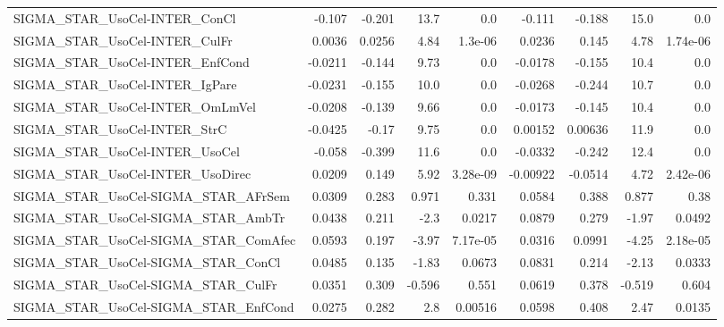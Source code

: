 \begin{tabular}{lrrrrrrrr}
SIGMA\_STAR\_UsoCel-INTER\_ConCl          &      -0.107 &       -0.201 &     13.7 &      0.0 &     -0.111 &      -0.188 &         15.0 &           0.0 \\
SIGMA\_STAR\_UsoCel-INTER\_CulFr          &      0.0036 &       0.0256 &     4.84 &  1.3e-06 &     0.0236 &       0.145 &         4.78 &      1.74e-06 \\
SIGMA\_STAR\_UsoCel-INTER\_EnfCond        &     -0.0211 &       -0.144 &     9.73 &      0.0 &    -0.0178 &      -0.155 &         10.4 &           0.0 \\
SIGMA\_STAR\_UsoCel-INTER\_IgPare         &     -0.0231 &       -0.155 &     10.0 &      0.0 &    -0.0268 &      -0.244 &         10.7 &           0.0 \\
SIGMA\_STAR\_UsoCel-INTER\_OmLmVel        &     -0.0208 &       -0.139 &     9.66 &      0.0 &    -0.0173 &      -0.145 &         10.4 &           0.0 \\
SIGMA\_STAR\_UsoCel-INTER\_StrC           &     -0.0425 &        -0.17 &     9.75 &      0.0 &    0.00152 &     0.00636 &         11.9 &           0.0 \\
SIGMA\_STAR\_UsoCel-INTER\_UsoCel         &      -0.058 &       -0.399 &     11.6 &      0.0 &    -0.0332 &      -0.242 &         12.4 &           0.0 \\
SIGMA\_STAR\_UsoCel-INTER\_UsoDirec       &      0.0209 &        0.149 &     5.92 & 3.28e-09 &   -0.00922 &     -0.0514 &         4.72 &      2.42e-06 \\
SIGMA\_STAR\_UsoCel-SIGMA\_STAR\_AFrSem    &      0.0309 &        0.283 &    0.971 &    0.331 &     0.0584 &       0.388 &        0.877 &          0.38 \\
SIGMA\_STAR\_UsoCel-SIGMA\_STAR\_AmbTr     &      0.0438 &        0.211 &     -2.3 &   0.0217 &     0.0879 &       0.279 &        -1.97 &        0.0492 \\
SIGMA\_STAR\_UsoCel-SIGMA\_STAR\_ComAfec   &      0.0593 &        0.197 &    -3.97 & 7.17e-05 &     0.0316 &      0.0991 &        -4.25 &      2.18e-05 \\
SIGMA\_STAR\_UsoCel-SIGMA\_STAR\_ConCl     &      0.0485 &        0.135 &    -1.83 &   0.0673 &     0.0831 &       0.214 &        -2.13 &        0.0333 \\
SIGMA\_STAR\_UsoCel-SIGMA\_STAR\_CulFr     &      0.0351 &        0.309 &   -0.596 &    0.551 &     0.0619 &       0.378 &       -0.519 &         0.604 \\
SIGMA\_STAR\_UsoCel-SIGMA\_STAR\_EnfCond   &      0.0275 &        0.282 &      2.8 &  0.00516 &     0.0598 &       0.408 &         2.47 &        0.0135 \\

\end{tabular}
